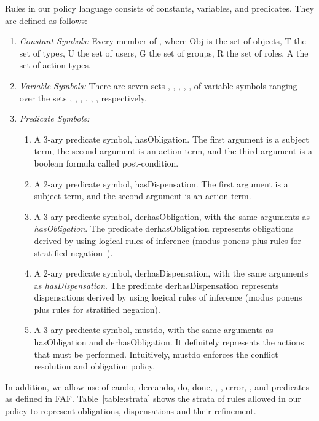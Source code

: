 \documentclass[12pt,journal,letterpaper,onecolumn]{IEEEtran}
\begin{document}
Rules in our policy language consists of constants, variables, and
predicates. They are defined as follows:

\begin{enumerate}
\item {\em Constant Symbols:} Every member of
, where Obj is the set of
objects, T the set of types, U the set of users, G the set of
groups, R the set of roles, A the set of action types.
\item {\em Variable Symbols:} There are seven sets ,  ,
,  ,  ,  of variable symbols ranging over the
sets , , , , , , respectively. \item {\em
Predicate Symbols:}
    \begin{enumerate}
    \item A 3-ary predicate symbol, {\ttfamily hasObligation}. The first argument is
    a subject term, the second argument is an action term,
    and the third argument is a boolean formula called post-condition.
    \item A 2-ary predicate symbol, {\ttfamily hasDispensation}. The first argument
    is a subject term, and the second argument is an action term.
    \item A 3-ary predicate symbol, {\ttfamily derhasObligation}, with the same arguments
    as {\em hasObligation}. The predicate {\ttfamily derhasObligation} represents obligations
    derived by using logical rules of inference
    (modus ponens plus rules for stratified negation~\cite{Apt88}).
    \item A 2-ary predicate symbol, {\ttfamily derhasDispensation}, with the same arguments
    as {\em hasDispensation}. The predicate {\ttfamily derhasDispensation} represents
    dispensations derived by using logical rules of inference
    (modus ponens plus rules for stratified negation).
    \item A 3-ary predicate symbol, {\ttfamily mustdo}, with the same arguments
    as {\ttfamily hasObligation} and {\ttfamily derhasObligation}. It definitely represents
    the actions that must be performed. Intuitively, {\ttfamily mustdo} enforces the conflict
    resolution and obligation policy.
    \end{enumerate}
\end{enumerate}

In addition, we allow use of {\ttfamily cando, dercando, do, done,
, , error}, , and  predicates as
defined in FAF. Table~\ref{table:strata} shows the strata of rules
allowed in our policy to represent obligations, dispensations and
their refinement.
\end{document}
